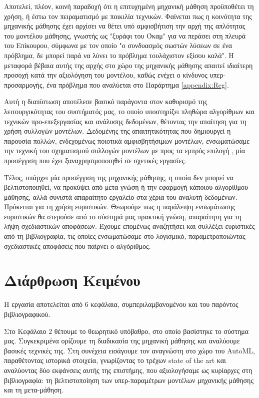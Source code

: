 Αποτελεί, πλέον, κοινή παραδοχή ότι η επιτυχημένη μηχανική μάθηση προϋποθέτει τη χρήση, ή έστω τον πειραματισμό με ποικιλία τεχνικών. Φαίνεται πως η κοινότητα της μηχανικής μάθησης έχει αρχίσει να θέτει υπό αμφισβήτιση την αρχή της απλότητας του μοντέλου μάθησης, γνωστής ως "ξυράφι του Όκαμ" για να περάσει στη πλευρά του Επίκουρου, σύμφωνα με τον οποίο "ο συνδυασμός σωστών λύσεων σε ένα πρόβλημα, δε μπορεί παρά να λύνει το πρόβλημα τουλάχιστον εξίσου καλά". Η μεταφορά βέβαια αυτής της αρχής στο χώρο της μηχανικής μάθησης απαιτεί ιδιαίτερη προσοχή κατά την αξιολόγηση του μοντέλου, καθώς ενέχει ο κίνδυνος υπερ-προσαρμογής, ένα πρόβλημα που αναλύεται στο Παράρτημα \ref{appendix:Reg}.

Αυτή η διαπίστωση αποτέλεσε βασικό παράγοντα στον καθορισμό της λειτουργικότητας του συστήματός μας, το οποίο υποστηρίζει πληθώρα αλγορίθμων και τεχνικών προ-επεξεργασίας και ανάλυσης δεδομένων, θέτοντας την απαίτηση για τη χρήση συλλογών μοντέλων. Δεδομένης της απαιτητικότητας που δημιουργεί η παρουσία πολλών, ενδεχομένως ποιοτικά αμφισβητήσιμων μοντέλων, ενσωματώσαμε την τεχνική του σχηματισμού συλλογών μοντέλων με προς τα εμπρός επιλογή \citep{Caruana:2004:ESL:1015330.1015432}, μία προσέγγιση που έχει ξαναχρησιμοποιηθεί σε σχετικές εργασίες.

Τέλος, υπάρχει μία προσέγγιση της μηχανικής μάθησης, η οποία δεν μπορεί να βελτιστοποιηθεί, να προκύψει από μετα-γνώση ή την εφαρμογή κάποιου αλγορίθμου μάθησης, αλλά συνιστά απαραίτητο εργαλείο στα χέρια του αναλυτή δεδομένων. Πρόκειται για τη χρήση ευριστικών. Θεωρούμε πως η παράλειψη ενσωμάτωσης ευριστικών θα στερούσε από το σύστημά μας πρακτική γνώση, απαραίτητη για τη λήψη σχεδιαστικών αποφάσεων. Έχουμε επομένως αναζητήσει και συλλέξει ευριστικές από τη βιβλιογραφία, τις οποίες ενσωματώσαμε στο λογισμικό, παραμετροποιώντας σχεδιαστικές αποφάσεις που παίρνει ο αλγόριθμος.

\section{Διάρθρωση Κειμένου} Η εργασία αποτελείται από 6 κεφάλαια, συμπεριλαμβανομένου και του παρόντος βιβλιογραφικού.

Στο Κεφάλαιο 2 θέτουμε το θεωρητικό υπόβαθρο, στο οποίο βασίστηκε το σύστημα μας. Συγκεκριμένα ορίζουμε τη διαδικασία της μηχανική μάθησης και αναλύουμε βασικές τεχνικές της. Στη συνέχεια εισάγουμε τον αναγνώστη στο χώρο του AutoML, παραθέτοντας ιστορικά στοιχεία, γνωρίζοντας το τρέχων state of the art και αναλύοντας δύο εκφάνσεις αυτής της επιστήμης, που αξιολογήσαμε ως κυρίαρχες στη βιβλιογραφία: τη βελτιστοποίηση των υπερ-παραμέτρων μοντέλων μηχανικής μάθησης και τη μετα-μάθηση.  

